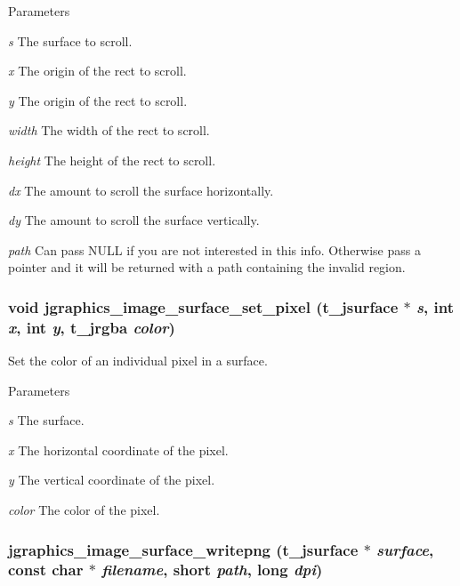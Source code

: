 \begin{DoxyParams}{Parameters}
\item[{\em s}]The surface to scroll. \item[{\em x}]The origin of the rect to scroll. \item[{\em y}]The origin of the rect to scroll. \item[{\em width}]The width of the rect to scroll. \item[{\em height}]The height of the rect to scroll. \item[{\em dx}]The amount to scroll the surface horizontally. \item[{\em dy}]The amount to scroll the surface vertically. \item[{\em path}]Can pass NULL if you are not interested in this info. Otherwise pass a pointer and it will be returned with a path containing the invalid region. \end{DoxyParams}
\hypertarget{group__jsurface_ga5f3bfeecac6a998770dc823c45c70775}{
\subsubsection[{jgraphics\_\-image\_\-surface\_\-set\_\-pixel}]{\setlength{\rightskip}{0pt plus 5cm}void jgraphics\_\-image\_\-surface\_\-set\_\-pixel ({\bf t\_\-jsurface} $\ast$ {\em s}, \/  int {\em x}, \/  int {\em y}, \/  {\bf t\_\-jrgba} {\em color})}}
\label{group__jsurface_ga5f3bfeecac6a998770dc823c45c70775}


Set the color of an individual pixel in a surface. 
\begin{DoxyParams}{Parameters}
\item[{\em s}]The surface. \item[{\em x}]The horizontal coordinate of the pixel. \item[{\em y}]The vertical coordinate of the pixel. \item[{\em color}]The color of the pixel. \end{DoxyParams}
\hypertarget{group__jsurface_ga9452f1ffe5e87c5be399a2f106d10b7c}{
\subsubsection[{jgraphics\_\-image\_\-surface\_\-writepng}]{ jgraphics\_\-image\_\-surface\_\-writepng ({\bf t\_\-jsurface} $\ast$ {\em surface}, \/  const char $\ast$ {\em filename}, \/  short {\em path}, \/  long {\em dpi})}}
\label{group__jsurface_ga9452f1ffe5e87c5be399a2f106d10b7c}


